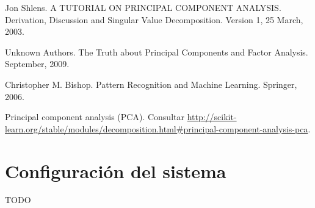 \documentclass[11pt,spanish,listoffigures,listoftables]{tfgetsinf}
\begin{document}
\begin{thebibliography}{10}

   Jon Shlens.
   \newblock A TUTORIAL ON PRINCIPAL COMPONENT ANALYSIS. Derivation, Discussion and Singular Value Decomposition.
   \newblock Version 1, 25 March, 2003.

   Unknown Authors.
   \newblock The Truth about Principal Components and Factor Analysis.
    September, 2009.
   
   Christopher M. Bishop.
   \newblock Pattern Recognition and Machine Learning.
   \newblock Springer, 2006.

   Principal component analysis (PCA). 
   \newblock Consultar 
   \url{http://scikit-learn.org/stable/modules/decomposition.html#principal-component-analysis-pca}.

\end{thebibliography}
\cleardoublepage


\APPENDIX


\chapter{Configuración del sistema}

TODO
\end{document}
